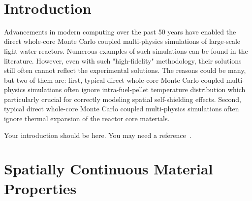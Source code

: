 \documentclass[11pt,a4paper,onecolumn,oneside]{report}
\begin{document}
\clearpage

\hbox{ }
\thispagestyle{empty}
\clearpage

\tableofcontents{}
\thispagestyle{empty}
\vfill
\clearpage

\listoffigures
\thispagestyle{empty}
\clearpage

\listoftables
\thispagestyle{empty}
\clearpage

\setcounter{page}{1}



\section{Introduction}
Advancements in modern computing over the past 50 years have enabled the direct whole-core Monte Carlo coupled multi-physics simulations of large-scale light water reactors. Numerous examples of such simulations can be found in the literature. However, even with such "high-fidelity" methodology, their solutions still often cannot reflect the experimental solutions. The reasons could be many, but two of them are: first, typical direct whole-core Monte Carlo coupled multi-physics simulations often ignore intra-fuel-pellet temperature distribution which particularly crucial for correctly modeling spatial self-shielding effects. Second, typical direct whole-core Monte Carlo coupled multi-physics simulations often ignore thermal expansion of the reactor core materials.

Your introduction should be here. You may need a reference~\cite{ref_sample}.


\newpage 
\section{Spatially Continuous Material Properties} 
\end{document}
